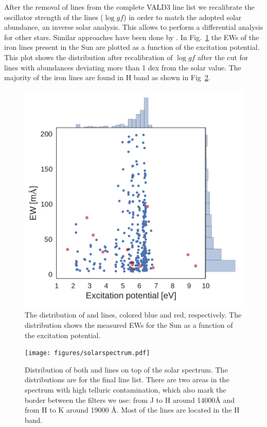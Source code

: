 \documentclass{aa}
\begin{document}
After the removal of lines from the complete VALD3 line list
we recalibrate the oscillator strength of the lines ($\log\mathit{gf}$)
in order to match the adopted solar abundance, an
inverse solar analysis. This allows to perform a differential
analysis for other stars. Similar approaches have been done by
\citet{Sousa2008a,Onehag2012,Rhodin2015}. In Fig.~\ref{fig:EWvsEP} the
EWs of the iron lines present in the Sun are plotted as a function
of the excitation potential. This plot shows the distribution after
recalibration of $\log \mathit{gf}$ after the cut for lines with abundances
deviating more than 1 dex from the solar value. The majority of the iron
lines are found in H band as shown in Fig~\ref{fig:solarspectrum}.



\begin{figure}[tpb]
    \centering
    \includegraphics[width=1.0\linewidth]{figures/EWvsEP.pdf}
    \caption{The distribution of  and  lines,
    colored blue and red, respectively. The distribution shows the
    measured EWs for the Sun as a function of the excitation potential.}
    \label{fig:EWvsEP}
\end{figure}


\begin{figure}[tpb]
    \centering
    \texttt{[image: figures/solarspectrum.pdf]}
    \caption{Distribution of both  and  lines
    on top of the solar spectrum. The distributions are for the final
    line list. There are two areas in the spectrum with high telluric
    contamination, which also mark the border between the filters we
    use: from J to H around 14000\si{\angstrom} and from H to K around
    19000 \si{\angstrom}. Most of the lines are located in the H band.}
    \label{fig:solarspectrum}
\end{figure}
\end{document}
